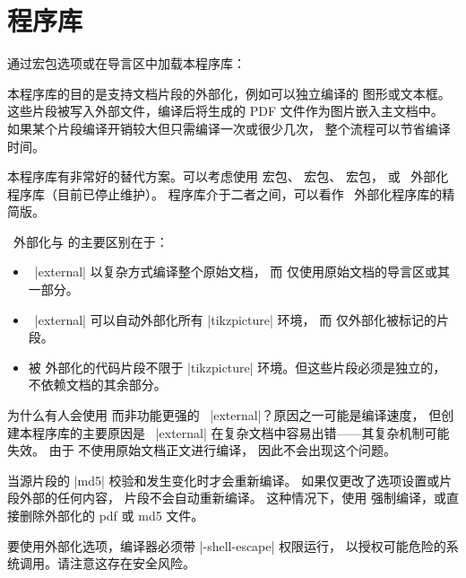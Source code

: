 \clearpage
\section{ 程序库}\label{sec:external}%
%
通过宏包选项或在导言区中加载本程序库：
\begin{dispListing}
\end{dispListing}

本程序库的目的是支持文档片段的外部化，例如可以独立编译的
图形或文本框。这些片段被写入外部文件，编译后将生成的
PDF 文件作为图片嵌入主文档中。
如果某个片段编译开销较大但只需编译一次或很少几次，
整个流程可以节省编译时间。

本程序库有非常好的替代方案。可以考虑使用
 宏包、
 宏包、
 宏包，
或 \tikzname\ 外部化程序库（目前已停止维护）。
 程序库介于二者之间，可以看作
\tikzname\ 外部化程序库的精简版。

\tikzname\ 外部化与  的主要区别在于：
\begin{itemize}
\item\tikzname\ |external| 以复杂方式编译整个原始文档，
  而  仅使用原始文档的导言区或其一部分。
\item\tikzname\ |external| 可以自动外部化所有 |tikzpicture| 环境，
  而  仅外部化被标记的片段。
\item 被  外部化的代码片段不限于
  |tikzpicture| 环境。但这些片段必须是独立的，
  不依赖文档的其余部分。
\end{itemize}
为什么有人会使用  而非功能更强的
\tikzname\ |external|？原因之一可能是编译速度，
但创建本程序库的主要原因是 \tikzname\ |external|
在复杂文档中容易出错——其复杂机制可能失效。
由于  不使用原始文档正文进行编译，
因此不会出现这个问题。

\begin{marker}
当源片段的 |md5| 校验和发生变化时才会重新编译。
如果仅更改了选项设置或片段外部的任何内容，
片段不会自动重新编译。
这种情况下，使用 
强制编译，或直接删除外部化的 pdf 或 md5 文件。
\end{marker}

\begin{marker}
要使用外部化选项，编译器必须带 |-shell-escape| 权限运行，
以授权可能危险的系统调用。请注意这存在安全风险。
\end{marker}


